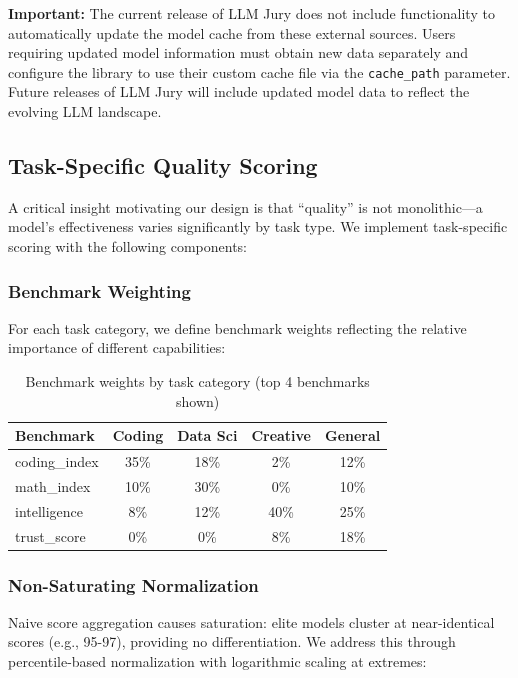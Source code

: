 \documentclass[11pt,a4paper]{article}
\begin{document}
\textbf{Important:} The current release of LLM Jury does not include functionality to automatically update the model cache from these external sources. Users requiring updated model information must obtain new data separately and configure the library to use their custom cache file via the \texttt{cache\_path} parameter. Future releases of LLM Jury will include updated model data to reflect the evolving LLM landscape.

\subsection{Task-Specific Quality Scoring}
\label{sec:scoring}

A critical insight motivating our design is that ``quality'' is not monolithic---a model's effectiveness varies significantly by task type. We implement task-specific scoring with the following components:

\subsubsection{Benchmark Weighting}

For each task category, we define benchmark weights reflecting the relative importance of different capabilities:

\begin{table}[h]
\centering
\caption{Benchmark weights by task category (top 4 benchmarks shown)}
\label{tab:weights}
\begin{tabular}{@{}lcccc@{}}
\toprule
\textbf{Benchmark} & \textbf{Coding} & \textbf{Data Sci} & \textbf{Creative} & \textbf{General} \\
\midrule
coding\_index & 35\% & 18\% & 2\% & 12\% \\
math\_index & 10\% & 30\% & 0\% & 10\% \\
intelligence & 8\% & 12\% & 40\% & 25\% \\
trust\_score & 0\% & 0\% & 8\% & 18\% \\
\bottomrule
\end{tabular}
\end{table}

\subsubsection{Non-Saturating Normalization}

Naive score aggregation causes saturation: elite models cluster at near-identical scores (e.g., 95-97), providing no differentiation. We address this through percentile-based normalization with logarithmic scaling at extremes:
\end{document}

